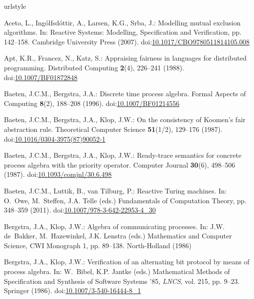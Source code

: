 \documentclass[smallcondensed]{svjour3}
\providecommand{\urlalt}[2]{\href{#1}{#2}}
\providecommand{\doi}[1]{doi:\urlalt{http://dx.doi.org/#1}{#1}}
\begin{document}
\newcommand{\Ruediger}{-R.}
\def\SSort#1{}\def\NSort#1{}
\begin{thebibliography}{10}
\providecommand{\url}[1]{{#1}}
\providecommand{\urlprefix}{URL }
\expandafter\ifx\csname urlstyle\endcsname\relax
  \providecommand{\doi}[1]{DOI~\discretionary{}{}{}#1}\else
  \providecommand{\doi}{DOI~\discretionary{}{}{}\begingroup
  \urlstyle{rm}\Url}\fi

Aceto, L., Ing\'{o}lfsd\'{o}ttir, A., Larsen, K.G., Srba, J.: Modelling mutual
  exclusion algorithms.
\newblock In: Reactive Systems: Modelling, Specification and Verification, pp.
  142--158. Cambridge University Press (2007).
\newblock \doi{10.1017/CBO9780511814105.008}

Apt, K.R., Francez, N., Katz, S.: Appraising fairness in languages for
  distributed programming.
\newblock Distributed Computing \textbf{2}(4), 226--241 (1988).
\newblock \doi{10.1007/BF01872848}

Baeten, J.C.M., Bergstra, J.A.: Discrete time process algebra.
\newblock Formal Aspects of Computing \textbf{8}(2), 188--208 (1996).
\newblock \doi{10.1007/BF01214556}

Baeten, J.C.M., Bergstra, J.A., Klop, J.W.: On the consistency of {Koomen's}
  fair abstraction rule.
\newblock Theoretical Computer Science \textbf{51}(1/2), 129--176 (1987).
\newblock \doi{10.1016/0304-3975(87)90052-1}

Baeten, J.C.M., Bergstra, J.A., Klop, J.W.: Ready-trace semantics for concrete
  process algebra with the priority operator.
\newblock Computer Journal \textbf{30}(6), 498--506 (1987).
\newblock \doi{10.1093/comjnl/30.6.498}

Baeten, J.C.M., Luttik, B., van Tilburg, P.: Reactive {Turing} machines.
\newblock In: O.~Owe, M.~Steffen, J.A. Telle (eds.) Fundamentals of Computation
  Theory, pp. 348--359 (2011).
\newblock \doi{10.1007/978-3-642-22953-4\_30}

Bergstra, J.A., Klop, J.W.: Algebra of communicating processes.
\newblock In: J.W. de~Bakker, M.~Hazewinkel, J.K. Lenstra (eds.) Mathematics
  and Computer Science, CWI Monograph 1, pp. 89--138. North-Holland (1986)

Bergstra, J.A., Klop, J.W.: Verification of an alternating bit protocol by
  means of process algebra.
\newblock In: W.~Bibel, K.P. Jantke (eds.) Mathematical Methods of
  Specification and Synthesis of Software Systems '85, \emph{\rm LNCS}, vol.
  215, pp. 9--23. Springer (1986).
\newblock \doi{10.1007/3-540-16444-8\_1}


\end{thebibliography}
\end{document}
